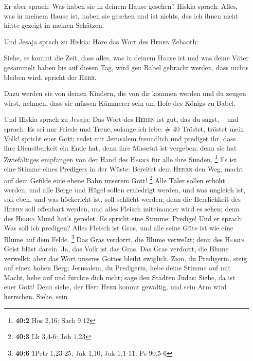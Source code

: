  Er aber sprach: Was haben sie in deinem Hause gesehen?
Hiskia sprach: Alles, was in meinem Hause ist, haben sie gesehen und ist
nichts, das ich ihnen nicht hätte gezeigt in meinen Schätzen.

 Und Jesaja sprach zu Hiskia: Höre das Wort des
\textsc{Herrn} Zebaoth:

 Siehe, es kommt die Zeit, dass alles, was in deinem Hause
ist und was deine Väter gesammelt haben bis auf diesen Tag, wird gen
Babel gebracht werden, dass nichts bleiben wird, spricht der
\textsc{Herr}.

 Dazu werden sie von deinen Kindern, die von dir kommen
werden und du zeugen wirst, nehmen, dass sie müssen Kämmerer sein am
Hofe des Königs zu Babel.

 Und Hiskia sprach zu Jesaja: Das Wort des \textsc{Herrn}
ist gut, das du sagst, -- und sprach: Es sei nur Friede und Treue,
solange ich lebe. \# 40  Tröstet, tröstet mein Volk!
spricht euer Gott;  redet mit Jerusalem freundlich und
prediget ihr, dass ihre Dienstbarkeit ein Ende hat, denn ihre Missetat
ist vergeben; denn sie hat Zwiefältiges empfangen von der Hand des
\textsc{Herrn} für alle ihre Sünden. \footnote{\textbf{40:2} Hos 2,16;
  Sach 9,12}  Es ist eine Stimme eines Predigers in der
Wüste: Bereitet dem \textsc{Herrn} den Weg, macht auf dem Gefilde eine
ebene Bahn unserem Gott! \footnote{\textbf{40:3} Lk 3,4-6; Joh 1,23}
 Alle Täler sollen erhöht werden, und alle Berge und Hügel
sollen erniedrigt werden, und was ungleich ist, soll eben, und was
höckericht ist, soll schlicht werden;  denn die
Herrlichkeit des \textsc{Herrn} soll offenbart werden, und alles Fleisch
miteinander wird es sehen; denn des \textsc{Herrn} Mund hat's geredet.
 Es spricht eine Stimme: Predige! Und er sprach: Was soll
ich predigen? Alles Fleisch ist Gras, und alle seine Güte ist wie eine
Blume auf dem Felde. \footnote{\textbf{40:6} 1Petr 1,23-25; Jak 1,10;
  Jak 1,1-11; Ps 90,5-6}  Das Gras verdorrt, die Blume
verwelkt; denn des \textsc{Herrn} Geist bläst darein. Ja, das Volk ist
das Gras.  Das Gras verdorrt, die Blume verwelkt; aber das
Wort unseres Gottes bleibt ewiglich.  Zion, du Predigerin,
steig auf einen hohen Berg; Jerusalem, du Predigerin, hebe deine Stimme
auf mit Macht, hebe auf und fürchte dich nicht; sage den Städten Judas:
Siehe, da ist euer Gott!  Denn siehe, der Herr
\textsc{Herr} kommt gewaltig, und sein Arm wird herrschen. Siehe, sein
